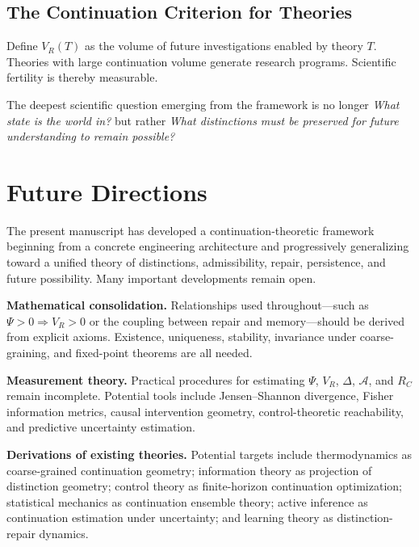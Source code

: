 \documentclass[12pt,a4paper]{article}
\newcommand{\A}{\mathcal{A}}
\begin{document}
\subsection{The Continuation Criterion for Theories}

Define $V_R(T)$ as the volume of future investigations enabled by theory $T$. Theories with large continuation volume generate research programs. Scientific fertility is thereby measurable.

The deepest scientific question emerging from the framework is no longer \emph{What state is the world in?} but rather \emph{What distinctions must be preserved for future understanding to remain possible?}

\section{Future Directions}

The present manuscript has developed a continuation-theoretic framework beginning from a concrete engineering architecture and progressively generalizing toward a unified theory of distinctions, admissibility, repair, persistence, and future possibility. Many important developments remain open.

\medskip\noindent\textbf{Mathematical consolidation.} Relationships used throughout---such as $\Psi > 0 \Rightarrow V_R > 0$ or the coupling between repair and memory---should be derived from explicit axioms. Existence, uniqueness, stability, invariance under coarse-graining, and fixed-point theorems are all needed.

\medskip\noindent\textbf{Measurement theory.} Practical procedures for estimating $\Psi$, $V_R$, $\Delta$, $\A$, and $R_C$ remain incomplete. Potential tools include Jensen--Shannon divergence, Fisher information metrics, causal intervention geometry, control-theoretic reachability, and predictive uncertainty estimation.

\medskip\noindent\textbf{Derivations of existing theories.} Potential targets include thermodynamics as coarse-grained continuation geometry; information theory as projection of distinction geometry; control theory as finite-horizon continuation optimization; statistical mechanics as continuation ensemble theory; active inference as continuation estimation under uncertainty; and learning theory as distinction-repair dynamics.
\end{document}
